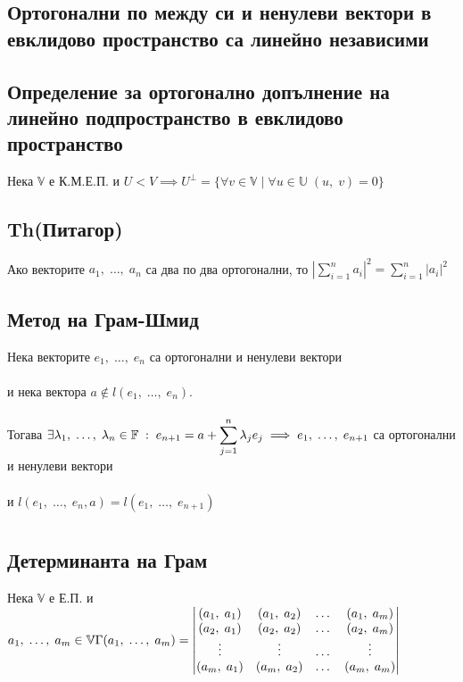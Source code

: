 \documentclass{article}
\newcommand{\V}{\mathbb{V}}
\newcommand{\F}{\mathbb{F}}
\newcommand{\UV}{\mathbb{U}}
\newcommand{\n}[1]{#1_1, \; \dots, \; #1_n}
\newcommand{\nplusone}[1]{#1_1, \; \dots, \; #1_{n + 1}}
\newcommand{\m}[1]{#1_1, \; \dots, \; #1_m}
\begin{document}
    \subsection{Ортогонални по между си и ненулеви вектори в евклидово пространство са линейно независими}
    \subsection{Определение за ортогонално допълнение на линейно подпространство в евклидово пространство}
    Нека \(\V\) е К.М.Е.П. и \(U < V \implies U^\perp = \{\forall v \in \V \; | \; \forall u \in \UV \; (u, \; v) = 0\}\)
    \subsection{Th(Питагор)}
    Ако векторите \(\n{a}\) са два по два ортогонални, то \(\left|\displaystyle\sum_{i = 1}^n a_i\right|^2 = \displaystyle\sum_{i = 1}^n |a_i|^2\)
    \subsection{Метод на Грам-Шмид}
    Нека векторите \(\n{e}\) са ортогонални и ненулеви вектори \\\\
    и нека вектора \(a \notin l(\n{e})\). \\\\
    Тогава \(\exists \n{\lambda} \in \F \; : \; e_{n + 1} = a + \displaystyle\sum_{j = 1}^n \lambda_j e_j \\\\
    \implies \nplusone{e}\) са ортогонални и ненулеви вектори \\\\
    и \(l(\n{e}, a) = l(\nplusone{e})\)
    \section{}
    \subsection{Детерминанта на Грам}
    Нека \(\V\) е Е.П. и \(\m{a} \in \V\\\\
    \Gamma(\m{a}) = \begin{vmatrix}
        (a_1, \; a_1) & (a_1, \; a_2) & \dots & (a_1, \; a_m)\\
        (a_2, \; a_1) & (a_2, \; a_2) & \dots & (a_2, \; a_m)\\
        \vdots & \vdots & \dots & \vdots\\
        (a_m, \; a_1) & (a_m, \; a_2) & \dots & (a_m, \; a_m)\\ 
    \end{vmatrix}\)
\end{document}
